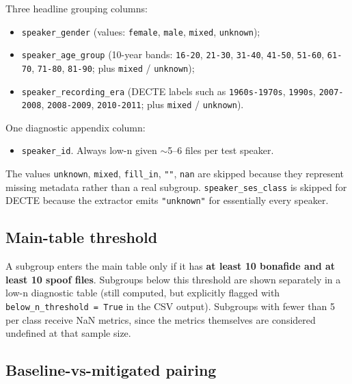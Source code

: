 Three headline grouping columns:

\begin{itemize}
    \item \texttt{speaker\_gender} (values: \texttt{female}, \texttt{male}, \texttt{mixed}, \texttt{unknown});
    \item \texttt{speaker\_age\_group} (10-year bands: \texttt{16-20}, \texttt{21-30}, \texttt{31-40},
        \texttt{41-50}, \texttt{51-60}, \texttt{61-70}, \texttt{71-80}, \texttt{81-90}; plus \texttt{mixed} /
        \texttt{unknown});
    \item \texttt{speaker\_recording\_era} (DECTE labels such as \texttt{1960s-1970s},
        \texttt{1990s}, \texttt{2007-2008}, \texttt{2008-2009}, \texttt{2010-2011}; plus \texttt{mixed} /
        \texttt{unknown}).
\end{itemize}

One diagnostic appendix column:

\begin{itemize}
    \item \texttt{speaker\_id}. Always low-n given $\sim$5--6 files per test speaker.
\end{itemize}

The values \texttt{unknown}, \texttt{mixed}, \texttt{fill\_in},
\texttt{""}, \texttt{nan} are skipped because they represent missing
metadata rather than a real subgroup. \texttt{speaker\_ses\_class}
is skipped for DECTE because the extractor emits \texttt{"unknown"}
for essentially every speaker.

\subsection{Main-table threshold}
\label{sec:methodology-subgroups-threshold}

A subgroup enters the main table only if it has \textbf{at least 10
bonafide and at least 10 spoof files}. Subgroups below this
threshold are shown separately in a low-n diagnostic table (still
computed, but explicitly flagged with \texttt{below\_n\_threshold =
True} in the CSV output). Subgroups with fewer than 5 per class
receive NaN metrics, since the metrics themselves are considered
undefined at that sample size.

\subsection{Baseline-vs-mitigated pairing}
\label{sec:methodology-subgroups-pairing}

